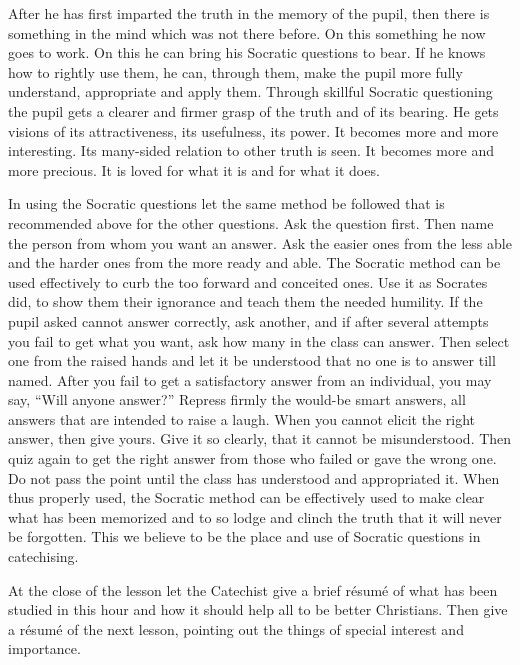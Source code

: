 After he has first imparted the truth in the memory of the pupil, then there is something in the mind which was not there before. On this something he now goes to work. On this he can bring his Socratic questions to bear. If he knows how to rightly use them, he can, through them, make the pupil more
fully understand, appropriate and apply them. Through skillful Socratic questioning the pupil gets a clearer and firmer grasp of the truth and of its bearing. He gets visions of its attractiveness, its usefulness, its power. It becomes more and more interesting. Its many-sided relation to other truth is seen. It becomes more and more precious. It is loved for what it is and for what it does.

In using the Socratic questions let the same method be followed that is recommended above for the other questions. Ask the question first. Then name the person from whom you want an answer. Ask the easier ones from the less able and the harder ones from the more ready and able. The Socratic method can be used effectively to curb the too forward and conceited ones. Use it as Socrates did, to show them their ignorance and teach them the needed humility. If the pupil asked cannot answer correctly, ask another, and if after several attempts you fail to get what you want, ask how many in the class can answer. Then select one from the raised hands and let it be understood that no one is to answer till named. After you fail to get a satisfactory answer from an individual, you may say, “Will anyone answer?” Repress firmly the would-be smart answers, all answers that are intended to raise a laugh. When you cannot elicit the right answer, then give yours. Give it so clearly, that it
cannot be misunderstood. Then quiz again to get the right answer from those who failed or gave the wrong one. Do not pass the point until the class has understood and appropriated it. When thus properly used, the Socratic method can be effectively used to make clear what has been memorized and to so lodge and clinch the truth that it will never be forgotten. This we believe to be the place and use of Socratic questions in catechising.

At the close of the lesson let the Catechist give a brief résumé of what has been studied in this hour and how it should help all to be better Christians. Then give a résumé of the next lesson, pointing out the things of special interest and importance.

